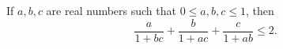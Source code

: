 If $a, b, c$ are real numbers such that $0 \leq a, b, c \leq 1$, then
\[ \frac{a}{1 + bc} + \frac{b}{1 + ac} + \frac{c}{1 + ab} \leq 2. \]
